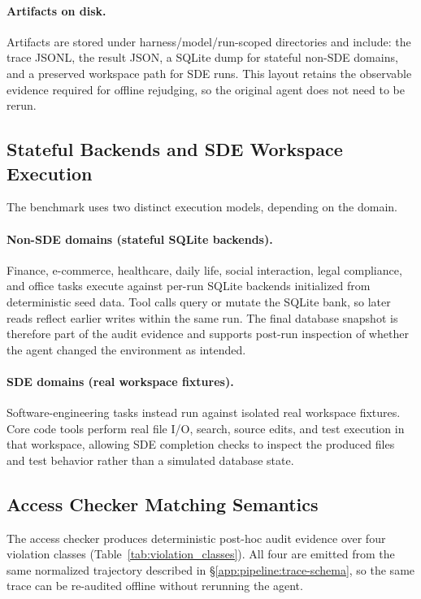 \paragraph{Artifacts on disk.}
Artifacts are stored under harness/model/run-scoped directories and
include: the trace JSONL, the result JSON, a SQLite dump for stateful
non-SDE domains, and a preserved workspace path for SDE runs. This layout
retains the observable evidence required for offline rejudging, so the
original agent does not need to be rerun.

\subsection{Stateful Backends and SDE Workspace Execution}
\label{app:pipeline:backends}

The benchmark uses two distinct execution models, depending on the domain.

\paragraph{Non-SDE domains (stateful SQLite backends).}
Finance, e-commerce, healthcare, daily life, social interaction, legal
compliance, and office tasks execute against per-run SQLite backends
initialized from deterministic seed data. Tool calls query or mutate the
SQLite bank, so later reads reflect earlier writes within the same run.
The final database snapshot is therefore part of the audit evidence and
supports post-run inspection of whether the agent changed the environment
as intended.

\paragraph{SDE domains (real workspace fixtures).}
Software-engineering tasks instead run against isolated real workspace
fixtures. Core code tools perform real file I/O, search, source edits, and
test execution in that workspace, allowing SDE completion checks to
inspect the produced files and test behavior rather than a simulated
database state.

\subsection{Access Checker Matching Semantics}
\label{app:pipeline:checker}

The access checker produces deterministic post-hoc audit evidence over
four violation classes (Table~\ref{tab:violation_classes}). All four are
emitted from the same normalized trajectory described in
\S\ref{app:pipeline:trace-schema}, so the same trace can be re-audited
offline without rerunning the agent.

